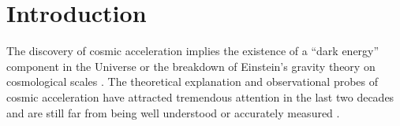 \documentclass[iop]{emulateapj}
\providecommand{\DIFadd}[1]{{\protect\color{blue}\uwave{#1}}} %
\providecommand{\DIFaddbegin}{} %
\providecommand{\DIFaddend}{} %
\begin{document}





\section{Introduction}

The discovery of cosmic acceleration \citep{Riess1998,Perl1999} implies \DIFaddbegin \DIFadd{either }\DIFaddend the existence of a ``dark energy'' component in the Universe 
or the breakdown of Einstein's gravity theory on cosmological scales \citep[see ][for a recent review]{2012IJMPD..2130002Y}.
The theoretical explanation and observational probes of cosmic acceleration have attracted 
tremendous attention in the last two decades and are still far from being well understood or accurately measured \citep{SW1989,Li2011,DHW2013}.
\end{document}
